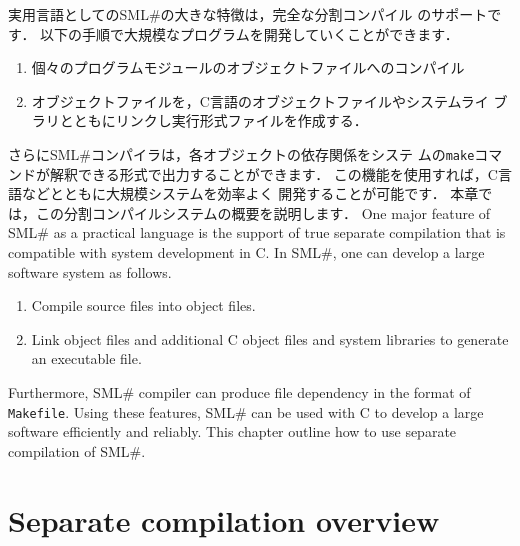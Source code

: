 \documentclass{jbook}
\newcommand{\txt}[2]{#2}
\newcommand{\smlsharp}{SML\#}
\begin{document}
\ifjp%
	実用言語としての\smlsharp{}の大きな特徴は，完全な分割コンパイル
のサポートです．
	以下の手順で大規模なプログラムを開発していくことができます．
\begin{enumerate}
\item 個々のプログラムモジュールのオブジェクトファイルへのコンパイル
\item オブジェクトファイルを，C言語のオブジェクトファイルやシステムライ
ブラリとともにリンクし実行形式ファイルを作成する．
\end{enumerate}
	さらに\smlsharp{}コンパイラは，各オブジェクトの依存関係をシステ
ムの{\tt make}コマンドが解釈できる形式で出力することができます．
	この機能を使用すれば，C言語などとともに大規模システムを効率よく
開発することが可能です．
	本章では，この分割コンパイルシステムの概要を説明します．
\else%
	One major feature of \smlsharp{} as a practical language is the
support of  true separate compilation that is compatible with system
development in C.
	In \smlsharp{}, one can develop a large software system as follows.
\begin{enumerate}
\item Compile source files into object files.
\item Link object files and additional C object files and system
libraries to generate an executable file.
\end{enumerate}
	Furthermore, \smlsharp{} compiler can produce file dependency in
the format of {\tt Makefile}.
	Using these features, \smlsharp{} can be used with C to develop
a large software efficiently and reliably.
	This chapter outline how to use separate compilation of \smlsharp.
\fi%

\section{\txt{分割コンパイルの概要}{Separate compilation overview}}
\label{sec:tutorialSeparateCompilation}
\end{document}
